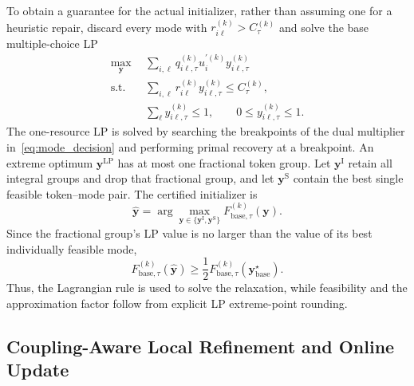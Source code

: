 \documentclass[journal]{IEEEtran}
\begin{document}
To obtain a guarantee for the actual initializer, rather than assuming one for a heuristic repair, discard every mode with $r_{i\ell}^{(k)}>C_{\tau}^{(k)}$ and solve the base multiple-choice LP
\begin{equation}
\begin{split}
\max_{\bm y}~~&\sum_{i,\ell}
q_{i\ell,\tau}^{(k)}u_i^{\prime(k)}y_{i\ell,\tau}^{(k)}\\
\mathrm{s.t.}~~&\sum_{i,\ell}r_{i\ell}^{(k)}y_{i\ell,\tau}^{(k)}
\leq C_{\tau}^{(k)},\\
&\sum_{\ell}y_{i\ell,\tau}^{(k)}\leq1,\qquad
0\leq y_{i\ell,\tau}^{(k)}\leq1.
\end{split}
\label{eq:base_lp}
\end{equation}
The one-resource LP is solved by searching the breakpoints of the dual multiplier in~\eqref{eq:mode_decision} and performing primal recovery at a breakpoint. An extreme optimum $\bm y^{\mathrm{LP}}$ has at most one fractional token group. Let $\bm y^{\mathrm I}$ retain all integral groups and drop that fractional group, and let $\bm y^{\mathrm S}$ contain the best single feasible token--mode pair. The certified initializer is
\begin{equation}
\widehat{\bm y}
=\arg\max_{\bm y\in\{\bm y^{\mathrm I},\bm y^{\mathrm S}\}}
F_{\mathrm{base},\tau}^{(k)}(\bm y).
\label{eq:lp_rounding}
\end{equation}
Since the fractional group's LP value is no larger than the value of its best individually feasible mode,
\begin{equation}
F_{\mathrm{base},\tau}^{(k)}(\widehat{\bm y})
\geq\frac12F_{\mathrm{base},\tau}^{(k)}(\bm y_{\mathrm{base}}^{\star}).
\label{eq:base_half_guarantee}
\end{equation}
Thus, the Lagrangian rule is used to solve the relaxation, while feasibility and the approximation factor follow from explicit LP extreme-point rounding.

\subsection{Coupling-Aware Local Refinement and Online Update}
\end{document}
